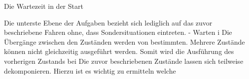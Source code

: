 Die Wartezeit in der Start

Die unterste Ebene der Aufgaben bezieht sich lediglich auf das zuvor beschriebene Fahren ohne, dass Sondersituationen eintreten.
- Warten i
\newline
Die Übergänge zwischen den Zuständen werden von bestimmten. Mehrere Zustände können nicht gleichzeitig ausgeführt werden. Somit wird die Ausführung des vorherigen Zustands bei 
\newline
Die zuvor beschriebenen Zustände lassen sich teilweise dekomponieren. Hierzu ist es wichtig zu ermitteln welche
